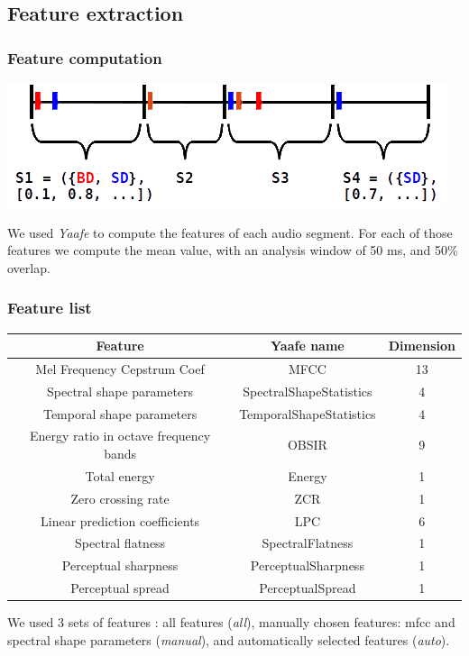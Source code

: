 \documentclass{beamer}
\begin{document}
    \subsection{Feature extraction}
    \begin{frame}
        \frametitle{Feature computation}
        \begin{center}
            \includegraphics[scale=0.7]{segmentation.png}
        \end{center}
        We used \emph{Yaafe} to compute the features of each audio segment. For each of those features we compute the mean value, with an analysis window of 50 ms, and 50\% overlap.
    \end{frame}
    \begin{frame}
        \frametitle{Feature list}
        \footnotesize 
        \begin{center}
        \begin{tabular}{|c|c|c|}
\hline
Feature&Yaafe name&Dimension\\
\hline
Mel Frequency Cepstrum Coef&MFCC&13\\
\hline
Spectral shape parameters&SpectralShapeStatistics&4\\
\hline
Temporal shape parameters&TemporalShapeStatistics&4\\
\hline
Energy ratio in octave frequency bands&OBSIR&9\\
\hline
Total energy&Energy&1\\
\hline
Zero crossing rate&ZCR&1\\
\hline
Linear prediction coefficients&LPC&6\\
\hline
Spectral flatness&SpectralFlatness&1\\
\hline
Perceptual sharpness&PerceptualSharpness&1\\
\hline
Perceptual spread&PerceptualSpread&1\\
\hline
\end{tabular}
\end{center}
        \normalsize
        We used 3 sets of features : all features (\emph{all}), manually chosen features: mfcc and spectral shape parameters (\emph{manual}), and automatically selected features (\emph{auto}).
    \end{frame}
\end{document}
